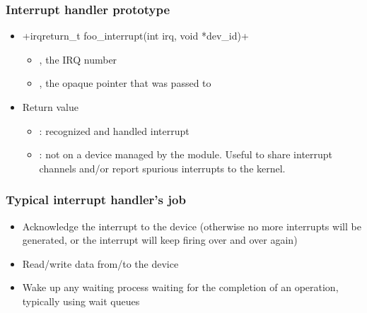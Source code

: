 \begin{frame}[fragile]
  \frametitle{Interrupt handler prototype}
  \begin{itemize}
  \item {}+irqreturn_t foo_interrupt(int irq, void *dev_id)+
    \begin{itemize}
    \item {}, the IRQ number
    \item {}, the opaque pointer that was passed to
    \end{itemize}
  \item Return value
    \begin{itemize}
    \item {}: recognized and handled interrupt
    \item {}: not on a device managed by the
      module. Useful to share interrupt channels and/or report
      spurious interrupts to the kernel.
    \end{itemize}
  \end{itemize}
\end{frame}

\begin{frame}
  \frametitle{Typical interrupt handler's job}
  \begin{itemize}
  \item Acknowledge the interrupt to the device (otherwise no more
    interrupts will be generated, or the interrupt will keep firing
    over and over again)
  \item Read/write data from/to the device
  \item Wake up any waiting process waiting for the completion of an
    operation, typically using wait queues
\end{itemize}
\end{frame}

